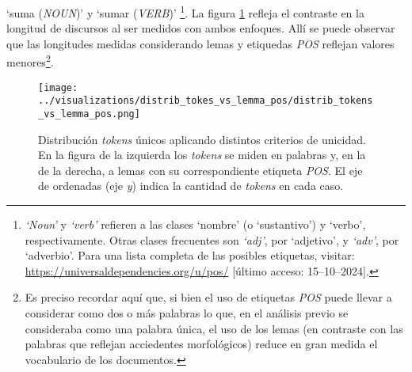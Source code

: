 `suma (\textit{NOUN})' y `sumar (\textit{VERB})'
\footnote{\textit{`Noun'} y \textit{`verb'} refieren a las clases `nombre'
(o `sustantivo') y `verbo', respectivamente. Otras clases frecuentes son \textit{`adj'},
por `adjetivo', y \textit{`adv'}, por `adverbio'. Para una lista completa
de las posibles etiquetas, visitar: \url{https://universaldependencies.org/u/pos/}
[\'ultimo acceso: 15--10--2024].}. La figura \ref{fig-distrib-unique-tokens} refleja el contraste
en la longitud de discursos al ser medidos con ambos enfoques.
All\'i se puede observar que las longitudes medidas considerando lemas y etiquedas
\textit{POS} reflejan valores menores\footnote{Es preciso recordar aqu\'i
que, si bien el uso de etiquetas \textit{POS} puede llevar a considerar
como dos o m\'as palabras lo que, en el an\'alisis previo se consideraba
como una palabra \'unica, el uso de los lemas (en contraste con
las palabras que reflejan acciedentes morfol\'ogicos) reduce en gran
medida el vocabulario de los documentos.}.

\begin{figure}[h!]
\centering
\texttt{[image: ../visualizations/distrib\_tokes\_vs\_lemma\_pos/distrib\_tokens\_vs\_lemma\_pos.png]}
\caption{Distribuci\'on \textit{tokens} \'unicos aplicando distintos criterios de unicidad.
En la figura de la izquierda los \textit{tokens} se miden en palabras y, en la de la
derecha, a lemas con su correspondiente etiqueta \textit{POS}. El eje de ordenadas
(eje \textit{y}) indica la cantidad de \textit{tokens} en cada caso.}
\label{fig-distrib-unique-tokens}
\end{figure}
